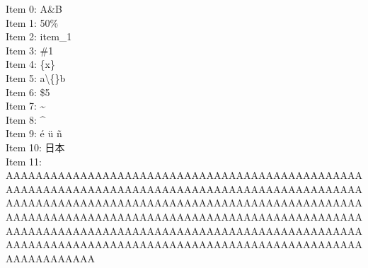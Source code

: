\documentclass[12pt,a4paper]{article}
\begin{document}
Item 0: A\&B\\
Item 1: 50\%\\
Item 2: item\_\allowbreak{}1\\
Item 3: \#1\\
Item 4: \{x\}\\
Item 5: a\textbackslash\{\}b\\
Item 6: \$5\\
Item 7: \textasciitilde{}\\
Item 8: \^{}\\
Item 9: é ü ñ\\
Item 10: 日本\\
Item 11: AAAAAAAAAAAAAAAAAAAAAAAAAAAAAAAAAAAAAAAAAAAAAAAAAAAAAAAAAAAAAAAAAAAAAAAAAAAAAAAAAAAAAAAAAAAAAAAAAAAAAAAAAAAAAAAAAAAAAAAAAAAAAAAAAAAAAAAAAAAAAAAAAAAAAAAAAAAAAAAAAAAAAAAAAAAAAAAAAAAAAAAAAAAAAAAAAAAAAAAAAAAAAAAAAAAAAAAAAAAAAAAAAAAAAAAAAAAAAAAAAAAAAAAAAAAAAAAAAAAAAAAAAAAAAAAAAAAAAAAAAAAAAAAAAAAAAAAAAAAA\\
\end{document}
